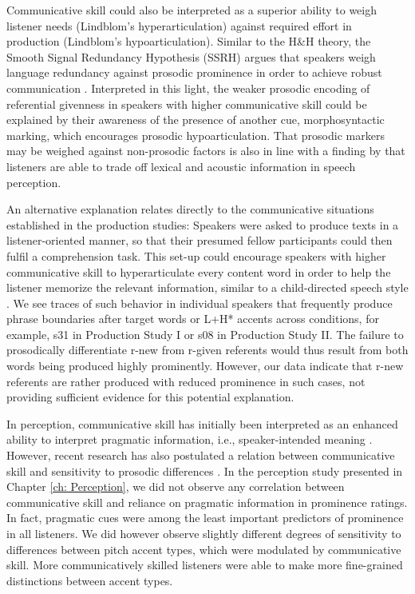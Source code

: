 Communicative skill could also be interpreted as a superior ability to weigh listener needs (Lindblom's hyperarticulation) against required effort in production (Lindblom's hypoarticulation). Similar to the H\&H theory, the Smooth Signal Redundancy Hypothesis (SSRH) argues that speakers weigh language redundancy against prosodic prominence in order to achieve robust communication \citep{aylettSmoothSignalRedundancy2004}. Interpreted in this light, the weaker prosodic encoding of referential givenness in speakers with higher communicative skill could be explained by their awareness of the presence of another cue, morphosyntactic marking, which encourages prosodic hypoarticulation. That prosodic markers may be weighed against non-prosodic factors is also in line with a finding by \citet{giovannoneIndividualDifferencesLexical2023} that listeners are able to trade off lexical and acoustic information in speech perception.

An alternative explanation relates directly to the communicative situations established in the production studies: Speakers were asked to produce texts in a listener-oriented manner, so that their presumed fellow participants could then fulfil a comprehension task. This set-up could encourage speakers with higher communicative skill to hyperarticulate every content word in order to help the listener memorize the relevant information, similar to a child-directed speech style \citep[e.g.,][]{cristiaInputLanguagePhonetics2013}. We see traces of such behavior in individual speakers that frequently produce phrase boundaries after target words or L+H* accents across conditions, for example, s31 in Production Study I or s08 in Production Study II. The failure to prosodically differentiate r-new from r-given referents would thus result from both words being produced highly prominently. However, our data indicate that r-new referents are rather produced with reduced prominence in such cases, not providing sufficient evidence for this potential explanation. 

In perception, communicative skill has initially been interpreted as an enhanced ability to interpret pragmatic information, i.e., speaker-intended meaning \citep{nieuwlandIncrementalityPragmaticProcessing2010, bishopIndividualDifferencesTopdown2016}. However, recent research has also postulated a relation between communicative skill and sensitivity to prosodic differences \citep{bishopPhonologyPhoneticsSignalextrinsic2020, orricoInfluenceEmpathyAutisticlike2023}. In the perception study presented in Chapter \ref{ch: Perception}, we did not observe any correlation between communicative skill and reliance on pragmatic information in prominence ratings. In fact, pragmatic cues were among the least important predictors of prominence in all listeners. We did however observe slightly different degrees of sensitivity to differences between pitch accent types, which were modulated by communicative skill. More communicatively skilled listeners were able to make more fine-grained distinctions between accent types. 

